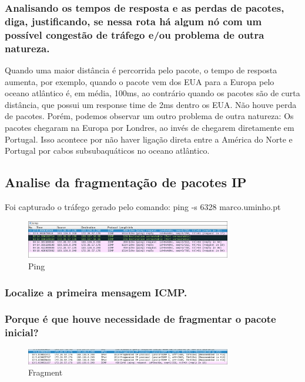 \documentclass{article}
\begin{document}
\subsubsection{Analisando os tempos de resposta e as perdas de pacotes, diga,
justificando, se nessa rota há algum nó com um possível
congestão de tráfego e/ou problema de outra natureza.}

Quando uma maior distância é percorrida pelo pacote, o tempo de resposta aumenta, por exemplo, quando o pacote vem dos EUA para a Europa pelo oceano atlântico é, em média, 100ms, ao contrário quando os pacotes são de curta distância, que possui um response time de 2ms dentro os EUA. Não houve perda de pacotes. Porém, podemos observar um outro problema de outra natureza: Os pacotes chegaram na Europa por Londres, ao invés de chegarem diretamente em Portugal. Isso acontece por não haver ligação direta entre a América do Norte e Portugal por cabos subsubaquáticos no oceano atlântico.

\subsection{Analise da fragmentação de pacotes IP}

Foi capturado o tráfego gerado pelo comando: ping -s 6328 marco.uminho.pt

\begin{figure}[h]
    \centering
    \includegraphics[width=0.8\textwidth]{images/ping.png}
    \caption{\label{fig:ping}Ping}
\end{figure}

\subsubsection{Localize a primeira mensagem ICMP.}
\subsubsection{Porque é que houve necessidade
de fragmentar o pacote inicial?}
\begin{figure}[h]
    \centering
    \includegraphics[width=0.8\textwidth]{images/fragment.png}
    \caption{\label{fig:fragment}Fragment}
\end{figure}
\end{document}
